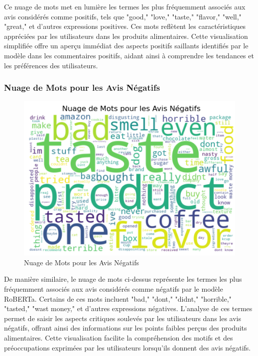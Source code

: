 Ce nuage de mots met en lumière les termes les plus fréquemment associés aux avis considérés comme positifs, tels que "good," "love," "taste," "flavor," "well," "great," et d'autres expressions positives. Ces mots reflètent les caractéristiques appréciées par les utilisateurs dans les produits alimentaires. Cette visualisation simplifiée offre un aperçu immédiat des aspects positifs saillants identifiés par le modèle dans les commentaires positifs, aidant ainsi à comprendre les tendances et les préférences des utilisateurs.


\subsubsection{Nuage de Mots pour les Avis Négatifs}

\begin{figure}[h]
    \centering
    \includegraphics[scale=0.5]{assets/wordcloudnegatif.PNG}
    \caption{Nuage de Mots pour les Avis Négatifs}
    \label{fig:nuagenegatif}
\end{figure}

De manière similaire, le nuage de mots ci-dessus représente les termes les plus fréquemment associés aux avis considérés comme négatifs par le modèle RoBERTa. Certains de ces mots incluent "bad," "dont," "didnt," "horrible," "tasted," "wast money," et d'autres expressions négatives. L'analyse de ces termes permet de saisir les aspects critiques soulevés par les utilisateurs dans les avis négatifs, offrant ainsi des informations sur les points faibles perçus des produits alimentaires. Cette visualisation facilite la compréhension des motifs et des préoccupations exprimées par les utilisateurs lorsqu'ils donnent des avis négatifs.